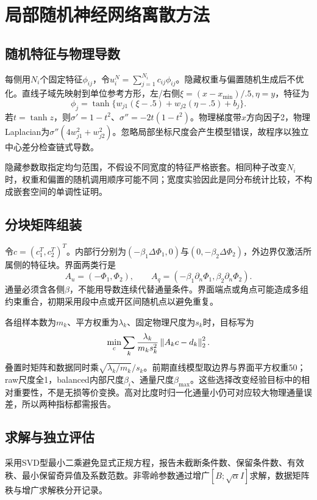 \chapter{局部随机神经网络离散方法}
\section{随机特征与物理导数}
每侧用$N_i$个固定特征$\phi_{ij}$，令$u_i^N=\sum_{j=1}^{N_i}c_{ij}\phi_{ij}$。隐藏权重与偏置随机生成后不优化。直线子域先映射到单位参考方形，左/右侧$\xi=(x-x_{\min})/.5,\eta=y$，特征为
\begin{equation}
\phi_j=\tanh\{w_{j1}(\xi-.5)+w_{j2}(\eta-.5)+b_j\}.
\end{equation}
若$t=\tanh z$，则$\sigma'=1-t^2$、$\sigma''=-2t(1-t^2)$。物理梯度带$x$方向因子2，物理Laplacian为$\sigma''(4w_{j1}^2+w_{j2}^2)$。忽略局部坐标尺度会产生模型错误，故程序以独立中心差分检查链式导数。

隐藏参数取指定均匀范围，不假设不同宽度的特征严格嵌套。相同种子改变$N_i$时，权重和偏置的随机调用顺序可能不同；宽度实验因此是同分布统计比较，不构成嵌套空间的单调性证明。

\section{分块矩阵组装}
令$c=(c_1^T,c_2^T)^T$。内部行分别为$(-\beta_1\Delta\Phi_1,0)$与$(0,-\beta_2\Delta\Phi_2)$，外边界仅激活所属侧的特征块。界面两类行是
\begin{equation}
A_u=(-\Phi_1,\Phi_2),\qquad
A_q=(-\beta_1\partial_n\Phi_1,\beta_2\partial_n\Phi_2).
\end{equation}
通量必须含各侧$\beta$，不能用导数连续代替通量条件。界面端点或角点可能造成多组约束重合，初期采用段中点或开区间随机点以避免重复。

各组样本数为$m_k$、平方权重为$\lambda_k$、固定物理尺度为$s_k$时，目标写为
\begin{equation}\label{eq:weighted}
\min_c\sum_k\frac{\lambda_k}{m_ks_k^2}\left\lVert A_kc-d_k\right\rVert_2^2.
\end{equation}
叠置时矩阵和数据同时乘$\sqrt{\lambda_k/m_k}/s_k$。前期直线模型取边界与界面平方权重50；raw尺度全1，balanced内部尺度$\beta_i$、通量尺度$\beta_{\max}$。这些选择改变经验目标中的相对重要性，不是无损等价变换。高对比度时归一化通量小仍可对应较大物理通量误差，所以两种指标都需报告。

\section{求解与独立评估}
采用SVD型最小二乘避免显式正规方程，报告未截断条件数、保留条件数、有效秩、最小保留奇异值及系数范数。非零岭参数通过增广$[B;\sqrt\alpha I]$求解，数据矩阵秩与增广求解秩分开记录。

